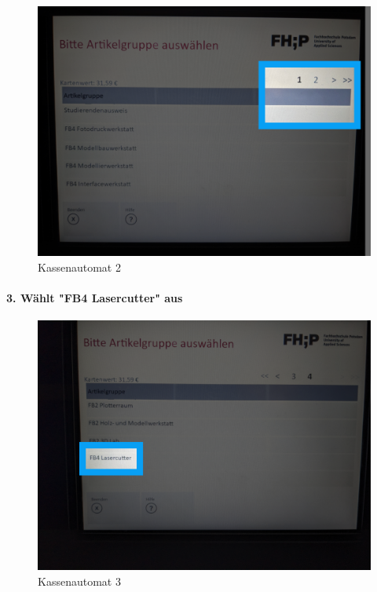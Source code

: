 \documentclass[]{article}
\let\oldparagraph\paragraph
\renewcommand{\paragraph}[1]{\oldparagraph{#1}\mbox{}}
\begin{document}
\begin{figure}
\hypertarget{fig:payment-2}{%
\centering
\includegraphics{assets/images/payment-2.png}
\caption{Kassenautomat 2}\label{fig:payment-2}
}
\end{figure}

\hypertarget{wuxe4hlt-fb4-lasercutter-aus}{%
\paragraph{3. Wählt "FB4 Lasercutter"
aus}\label{wuxe4hlt-fb4-lasercutter-aus}}

\begin{figure}
\hypertarget{fig:payment-3}{%
\centering
\includegraphics{assets/images/payment-3.png}
\caption{Kassenautomat 3}\label{fig:payment-3}
}
\end{figure}
\end{document}
